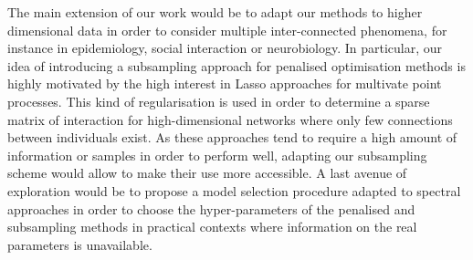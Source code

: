     The main extension of our work would be to adapt our methods to higher dimensional data in order to consider multiple inter-connected phenomena, for instance in epidemiology, social interaction or neurobiology.
    In particular, our idea of introducing a subsampling approach for penalised optimisation methods is highly motivated by the high interest in Lasso approaches for multivate point processes.
    This kind of regularisation is used in order to determine a sparse matrix of interaction for high-dimensional networks where only few connections between individuals exist.
    As these approaches tend to require a high amount of information or samples in order to perform well, adapting our subsampling scheme would allow to make their use more accessible.
    A last avenue of exploration would be to propose a model selection procedure adapted to spectral approaches in order to choose the hyper-parameters of the penalised and subsampling methods in practical contexts where information on the real parameters is unavailable.



